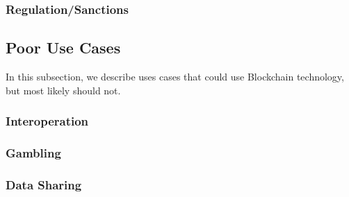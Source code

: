 \subsubsection{Regulation/Sanctions}

\subsection{Poor Use Cases}
In this subsection, we describe uses cases that could use Blockchain technology, but most likely should not.

\subsubsection{Interoperation}

\subsubsection{Gambling}

\subsubsection{Data Sharing}

